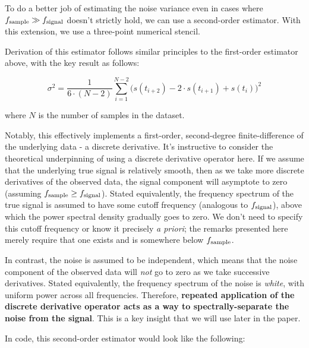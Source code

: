 \documentclass[11pt]{article}
\begin{document}
To do a better job of estimating the noise variance even in cases where
\(f_{\rm sample} \gg f_{\rm signal}\) doesn't strictly hold, we can use
a second-order estimator. With this extension, we use a three-point
numerical stencil.

Derivation of this estimator follows similar principles to the
first-order estimator above, with the key result as follows:

\[\sigma^2 = \frac{1}{6 \cdot (N-2)} \sum_{i=1}^{N-2} \Big( s(t_{i+2}) - 2 \cdot s(t_{i+1}) + s(t_i) \Big)^2\]

where \(N\) is the number of samples in the dataset.

Notably, this effectively implements a first-order, second-degree
finite-difference of the underlying data - a discrete derivative. It's
instructive to consider the theoretical underpinning of using a discrete
derivative operator here. If we assume that the underlying true signal
is relatively smooth, then as we take more discrete derivatives of the
observed data, the signal component will asymptote to zero (assuming
\(f_{\rm sample} \geq f_{\rm signal}\)). Stated equivalently, the
frequency spectrum of the true signal is assumed to have some cutoff
frequency (analogous to \(f_{\rm signal}\)), above which the power
spectral density gradually goes to zero. We don't need to specify this
cutoff frequency or know it precisely \emph{a priori}; the remarks
presented here merely require that one exists and is somewhere below
\(f_{\rm sample}\).

In contrast, the noise is assumed to be independent, which means that
the noise component of the observed data will \emph{not} go to zero as
we take successive derivatives. Stated equivalently, the frequency
spectrum of the noise is \emph{white}, with uniform power across all
frequencies. Therefore, \textbf{repeated application of the discrete
derivative operator acts as a way to spectrally-separate the noise from
the signal}. This is a key insight that we will use later in the paper.

In code, this second-order estimator would look like the following:
\end{document}

